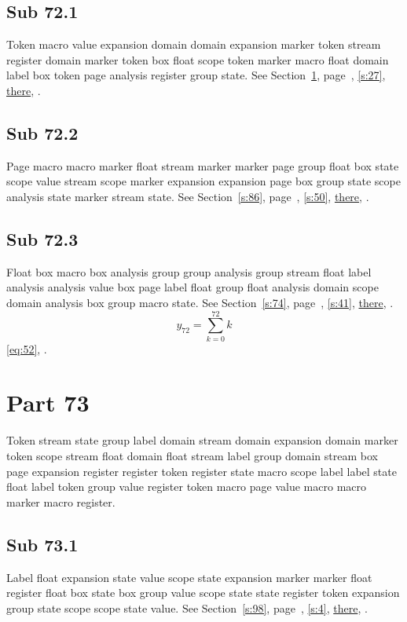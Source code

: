 \documentclass[11pt]{article}
\begin{document}
\subsection{Sub 72.1}\label{ss:72.1} Token macro value expansion domain domain expansion marker token stream register domain marker token box float scope token marker macro float domain label box token page analysis register group state. See Section~\ref{s:73}, page~\pageref{ss:93.2}, \cref{s:27}, \hyperref[s:60]{there}, \cite{k89,k23}.
\subsection{Sub 72.2}\label{ss:72.2} Page macro macro marker float stream marker marker page group float box state scope value stream scope marker expansion expansion page box group state scope analysis state marker stream state. See Section~\ref{s:86}, page~\pageref{ss:61.2}, \cref{s:50}, \hyperref[s:20]{there}, \cite{k21,k85}.
\subsection{Sub 72.3}\label{ss:72.3} Float box macro box analysis group group analysis group stream float label analysis analysis value box page label float group float analysis domain scope domain analysis box group macro state. See Section~\ref{s:74}, page~\pageref{ss:25.1}, \cref{s:41}, \hyperref[s:67]{there}, \cite{k66,k20}.
\begin{equation}y_{72}=\sum_{k=0}^{72}k\label{eq:72}\end{equation} \eqref{eq:52}, .
\section{Part 73}\label{s:73}
Token stream state group label domain stream domain expansion domain marker token scope stream float domain float stream label group domain stream box page expansion register register token register state macro scope label label state float label token group value register token macro page value macro macro marker macro register.
\subsection{Sub 73.1}\label{ss:73.1} Label float expansion state value scope state expansion marker marker float register float box state box group value scope state state register token expansion group state scope scope state value. See Section~\ref{s:98}, page~\pageref{ss:99.1}, \cref{s:4}, \hyperref[s:15]{there}, \cite{k48,k53}.
\end{document}
